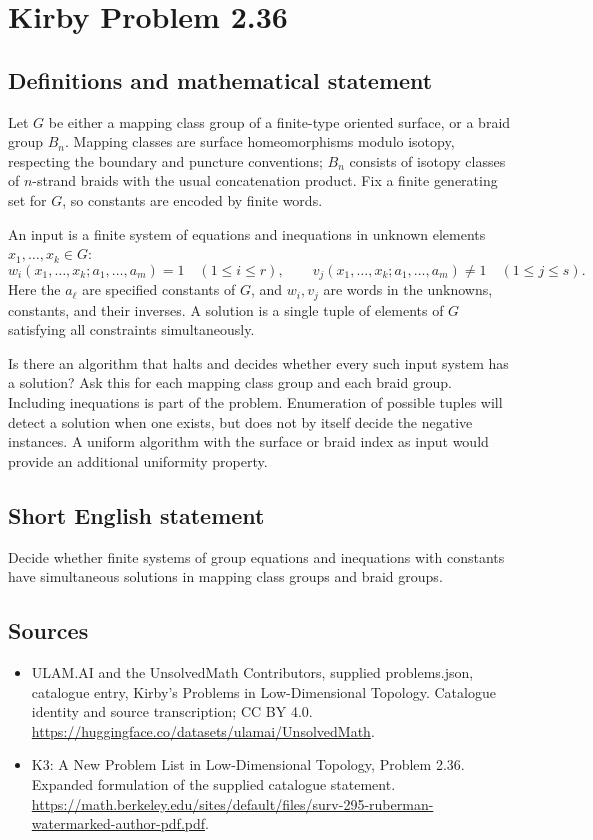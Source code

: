 \documentclass[11pt,a4paper]{article}
\begin{document}
\section*{Kirby Problem 2.36}\label{statement}

\subsection{Definitions and mathematical statement}
Let $G$ be either a mapping class group of a finite-type oriented surface,
or a braid group $B_n$. Mapping classes are surface homeomorphisms modulo
isotopy, respecting the boundary and puncture conventions; $B_n$ consists of
isotopy classes of $n$-strand braids with the usual concatenation product.
Fix a finite generating set for $G$, so constants are encoded by finite words.

An input is a finite system of equations and inequations in unknown elements
$x_1,\ldots,x_k\in G$:
\[
 w_i(x_1,\ldots,x_k;a_1,\ldots,a_m)=1\quad(1\leq i\leq r),
 \qquad
 v_j(x_1,\ldots,x_k;a_1,\ldots,a_m)\ne1\quad(1\leq j\leq s).
\]
Here the $a_\ell$ are specified constants of $G$, and $w_i,v_j$ are words
in the unknowns, constants, and their inverses. A solution is a single tuple
of elements of $G$ satisfying all constraints simultaneously.

Is there an algorithm that halts and decides whether every such input system
has a solution? Ask this for each mapping class group and each braid group.
Including inequations is part of the problem. Enumeration of possible tuples
will detect a solution when one exists, but does not by itself decide the
negative instances. A uniform algorithm with the surface or braid index as
input would provide an additional uniformity property.
\subsection{Short English statement}
Decide whether finite systems of group equations and inequations with constants have simultaneous solutions in mapping class groups and braid groups.
\subsection{Sources}
\begin{itemize}
\item[S1] ULAM.AI and the UnsolvedMath Contributors, supplied problems.json, catalogue entry, Kirby's Problems in Low-Dimensional Topology. Catalogue identity and source transcription; CC BY 4.0.
\url{https://huggingface.co/datasets/ulamai/UnsolvedMath}.
\item[S2] K3: A New Problem List in Low-Dimensional Topology, Problem 2.36. Expanded formulation of the supplied catalogue statement.
\url{https://math.berkeley.edu/sites/default/files/surv-295-ruberman-watermarked-author-pdf.pdf}.
\end{itemize}
\end{document}
